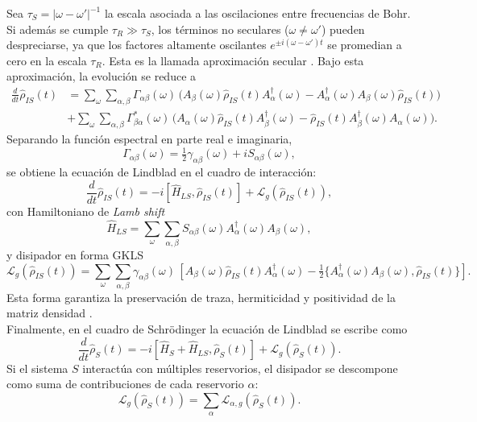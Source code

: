 Sea $\tau_{S}=|\omega-\omega'|^{-1}$ la escala asociada a las oscilaciones entre frecuencias de Bohr. Si además se cumple $\tau_{R}\gg \tau_{S}$, los términos no seculares ($\omega\neq\omega'$) pueden despreciarse, ya que los factores altamente oscilantes $e^{\pm i(\omega-\omega')t}$ se promedian a cero en la escala $\tau_{R}$. Esta es la llamada aproximación secular \cite{breuer2002theory}. Bajo esta aproximación, la evolución se reduce a
\begin{align*}
    \frac{d}{dt}\hat{\rho}_{IS}(t) &=
    \sum_{\omega}\sum_{\alpha,\beta} \Gamma_{\alpha\beta}(\omega)\,
    \Big(A_{\beta}(\omega)\hat{\rho}_{IS}(t)A_{\alpha}^{\dagger}(\omega)
        - A_{\alpha}^{\dagger}(\omega)A_{\beta}(\omega)\hat{\rho}_{IS}(t)\Big) \\
    &+ \sum_{\omega}\sum_{\alpha,\beta} \Gamma^{*}_{\beta\alpha}(\omega)\,
    \Big(A_{\alpha}(\omega)\hat{\rho}_{IS}(t)A_{\beta}^{\dagger}(\omega)
        - \hat{\rho}_{IS}(t)A_{\beta}^{\dagger}(\omega)A_{\alpha}(\omega)\Big).
\end{align*}
Separando la función espectral en parte real e imaginaria,
\begin{equation*}
    \Gamma_{\alpha\beta}(\omega) = \tfrac{1}{2}\gamma_{\alpha\beta}(\omega) + iS_{\alpha\beta}(\omega),
\end{equation*}
se obtiene la ecuación de Lindblad en el cuadro de interacción:
\begin{equation}
    \frac{d}{dt}\hat{\rho}_{IS}(t) = -i[\hat{H}_{LS}, \hat{\rho}_{IS}(t)] + \mathcal{L}_{g}(\hat{\rho}_{IS}(t)),
    \label{seclindbladfinal}
\end{equation}
con Hamiltoniano de \emph{Lamb shift}
\begin{equation*}
    \hat{H}_{LS} = \sum_{\omega}\sum_{\alpha,\beta} S_{\alpha\beta}(\omega)A_{\alpha}^{\dagger}(\omega)A_{\beta}(\omega),
\end{equation*}
y disipador en forma GKLS
\begin{equation*}
    \mathcal{L}_{g}(\hat{\rho}_{IS}(t)) = \sum_{\omega}\sum_{\alpha,\beta} \gamma_{\alpha\beta}(\omega)\,
    \left[A_{\beta}(\omega)\hat{\rho}_{IS}(t)A_{\alpha}^{\dagger}(\omega) - \tfrac{1}{2}\{A_{\alpha}^{\dagger}(\omega)A_{\beta}(\omega), \hat{\rho}_{IS}(t)\}\right].
\end{equation*}
Esta forma garantiza la preservación de traza, hermiticidad y positividad de la matriz densidad \cite{manzano2020short}.
\\

Finalmente, en el cuadro de Schrödinger la ecuación de Lindblad se escribe como
\begin{equation}
    \frac{d}{dt}\hat{\rho}_{S}(t) = -i[\hat{H}_{S}+\hat{H}_{LS}, \hat{\rho}_{S}(t)] + \mathcal{L}_{g}(\hat{\rho}_{S}(t)).
    \label{eqsec2:lindbladS}
\end{equation}
Si el sistema $S$ interactúa con múltiples reservorios, el disipador se descompone como suma de contribuciones de cada reservorio $\alpha$:
\begin{equation*}
    \mathcal{L}_{g}(\hat{\rho}_{S}(t)) = \sum_{\alpha}\mathcal{L}_{\alpha,g}(\hat{\rho}_{S}(t)).
\end{equation*}

